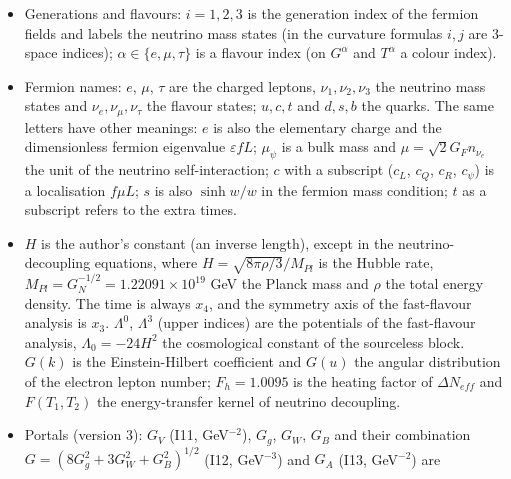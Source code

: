 \documentclass[
  10pt,
]{article}
\begin{document}
\begin{itemize}
  \(\kappa = 8\pi G_8\) without subscript); \(\theta_{12}\),
  \(\theta_{13}\), \(\theta_{23}\), \(\delta\) are mixing angles and the
  Dirac phase (\(\theta_W\) the weak angle, \(\theta\) also the
  parameter of a gauge transformation; \(\delta\) also a variation, as
  in \(\delta k\)), \(s_{ij} = \sin\theta_{ij}\) and
  \(c_{ij} = \cos\theta_{ij}\); \(J\) is the Jarlskog invariant, except
  in the block operator \(J = \gamma^{x_0}\gamma^{x_1}\gamma^{x_4}\).
\item
  Generations and flavours: \(i = 1, 2, 3\) is the generation index of
  the fermion fields and labels the neutrino mass states (in the
  curvature formulas \(i, j\) are 3-space indices);
  \(\alpha \in \{e, \mu, \tau\}\) is a flavour index (on \(G^\alpha\)
  and \(T^\alpha\) a colour index).
\item
  Fermion names: \(e\), \(\mu\), \(\tau\) are the charged leptons,
  \(\nu_1, \nu_2, \nu_3\) the neutrino mass states and
  \(\nu_e, \nu_\mu, \nu_\tau\) the flavour states; \(u, c, t\) and
  \(d, s, b\) the quarks. The same letters have other meanings: \(e\) is
  also the elementary charge and the dimensionless fermion eigenvalue
  \(\varepsilon fL\); \(\mu_\psi\) is a bulk mass and
  \(\mu = \sqrt2 G_Fn_{\nu_e}\) the unit of the neutrino
  self-interaction; \(c\) with a subscript (\(c_L\), \(c_Q\), \(c_R\),
  \(c_\psi\)) is a localisation \(f\mu L\); \(s\) is also \(\sinh w/w\)
  in the fermion mass condition; \(t\) as a subscript refers to the
  extra times.
\item
  \(H\) is the author's constant (an inverse length), except in the
  neutrino-decoupling equations, where \(H = \sqrt{8\pi\rho/3}/M_{Pl}\)
  is the Hubble rate, \(M_{Pl} = G_N^{-1/2} = 1.22091\times10^{19}\) GeV
  the Planck mass and \(\rho\) the total energy density. The time is
  always \(x_4\), and the symmetry axis of the fast-flavour analysis is
  \(x_3\). \(\Lambda^0\), \(\Lambda^3\) (upper indices) are the
  potentials of the fast-flavour analysis, \(\Lambda_0 = -24H^2\) the
  cosmological constant of the sourceless block. \(G(k)\) is the
  Einstein-Hilbert coefficient and \(G(u)\) the angular distribution of
  the electron lepton number; \(F_h = 1.0095\) is the heating factor of
  \(\Delta N_{eff}\) and \(F(T_1, T_2)\) the energy-transfer kernel of
  neutrino decoupling.
\item
  Portals (version 3): \(G_V\) (I11, GeV\(^{-2}\)), \(G_g\), \(G_W\),
  \(G_B\) and their combination \(G = (8G_g^2 + 3G_W^2 + G_B^2)^{1/2}\)
  (I12, GeV\(^{-3}\)) and \(G_A\) (I13, GeV\(^{-2}\)) are

\end{itemize}
\end{document}
